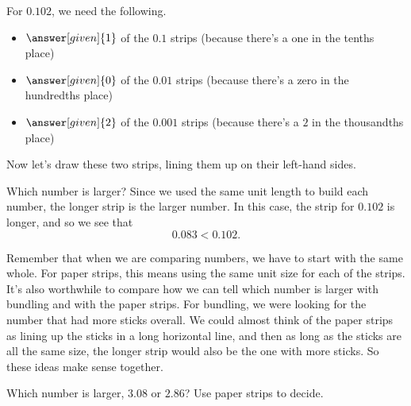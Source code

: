 \documentclass{ximera}
\begin{document}
\begin{example}
For $0.102$, we need the following.
\begin{itemize}
	\item $\answer[given]{1}$ of the $0.1$ strips (because there's a one in the tenths place)
	\item $\answer[given]{0}$ of the $0.01$ strips (because there's a zero in the hundredths place)
	\item $\answer[given]{2}$ of the $0.001$ strips (because there's a $2$ in the thousandths place)
\end{itemize}

Now let's draw these two strips, lining them up on their left-hand sides.

\begin{image}
\end{image}

Which number is larger? Since we used the same unit length to build each number, the longer strip is the larger number. In this case, the strip for $0.102$ is longer, and so we see that
\[
0.083 < 0.102.
\]


\end{example}

Remember that when we are comparing numbers, we have to start with the same whole. For paper strips, this means using the same unit size for each of the strips. It's also worthwhile to compare how we can tell which number is larger with bundling and with the paper strips. For bundling, we were looking for the number that had more sticks overall. We could almost think of the paper strips as lining up the sticks in a long horizontal line, and then as long as the sticks are all the same size, the longer strip would also be the one with more sticks. So these ideas make sense together.

\begin{question}
Which number is larger, $3.08$ or $2.86$? Use paper strips to decide.

\begin{multipleChoice}
\end{multipleChoice}
\end{question}
\end{document}
